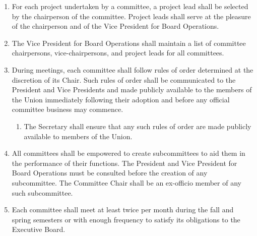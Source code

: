 \documentclass{uniondoc}
\begin{document}
\begin{enumerate}
  \begin{enumerate}
  \item Any committee member who is not a member of the Executive Board must be approved by the committee chairperson before receiving membership in the committee.
  \item Members of a committee shall serve at the pleasure of the committee chairperson and of the Vice President for Board Operations and may be removed at any time for good cause.
    \begin{enumerate}
    \item Good cause for removal includes, but is not limited to, neglecting the duties of membership, failure to adhere to the rules of order during meetings, or failure to adhere to these Bylaws when conducting business in the name of the committee.
    \item Members are expected to dutifully attend meetings of the committee and complete committee assignments within reasonable deadlines.
    \end{enumerate}
  \end{enumerate}
\item For each project undertaken by a committee, a project lead shall be selected by the chairperson of the committee. Project leads shall serve at the pleasure of the chairperson and of the Vice President for Board Operations.
\item The Vice President for Board Operations shall maintain a list of committee chairpersons, vice-chairpersons, and project leads for all committees.
\item During meetings, each committee shall follow rules of order determined at the discretion of its Chair. Such rules of order shall be communicated to the President and Vice Presidents and made publicly available to the members of the Union immediately following their adoption and before any official committee business may commence.
  \begin{enumerate}
  \item The Secretary shall ensure that any such rules of order are made publicly available to members of the Union.
  \end{enumerate}
\item All committees shall be empowered to create subcommittees to aid them in the performance of their functions. The President and Vice President for Board Operations must be consulted before the creation of any subcommittee. The Committee Chair shall be an ex-officio member of any such subcommittee.
\item Each committee shall meet at least twice per month during the fall and spring semesters or with enough frequency to satisfy its obligations to the Executive Board.

\end{enumerate}
\end{document}
